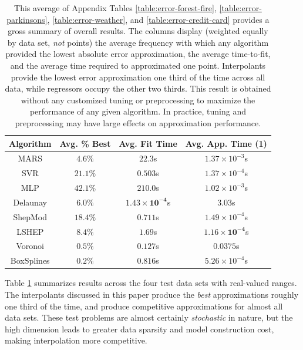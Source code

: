 \documentclass[smallextended,final]{svjour3}       %
\begin{document}
                                                                      
\begin{table}
  \centering
  \begin{tabular}{c|c|c|c}
    \hline
    Algorithm & Avg. \% Best & Avg. Fit Time & Avg. App. Time (1)\\
    \hline
    MARS & $4.6\%$ & $22.3$s & $1.37 \times 10^{-3}$s\\
    SVR & $\mathit{21.1}\%$ & $0.503$s & $\mathit{1.37 \times 10^{-4}}$s\\
    MLP & $\mathbf{42.1}\%$ & $210.0$s & $1.02 \times 10^{-3}$s\\
    Delaunay & $6.0\%$ & $\mathbf{1.43 \times 10^{-4}}$s & $3.03$s\\
    ShepMod & $18.4\%$ & $0.711$s & $1.49 \times 10^{-4}$s\\
    LSHEP & $8.4\%$ & $1.69$s & $\mathbf{1.16 \times 10^{-4}}$s\\
    Voronoi & $0.5\%$ & $\mathit{0.127}$s & $0.0375$s\\
    BoxSplines & $0.2\%$ & $0.816$s & $5.26 \times 10^{-4}$s\\
    \hline
  \end{tabular}
  \caption{This average of Appendix Tables
  \ref{table:error-forest-fire}, \ref{table:error-parkinsons},
  \ref{table:error-weather}, and \ref{table:error-credit-card} provides
  a gross summary of overall results. The columns display (weighted equally
  by data set, \textit{not} points) the average frequency with which any
  algorithm provided the lowest absolute error approximation, the average
  time-to-fit, and the average time required to approximated one point.
  Interpolants provide the lowest error approximation one third of the
  time across all data, while regressors occupy the other two thirds. This
  result is obtained without any customized tuning or preprocessing to
  maximize the performance of any given algorithm. In practice, tuning and
  preprocessing may have large effects on approximation performance.}

 \label{table:avg-performance}
\end{table}

Table \ref{table:avg-performance} summarizes results across the four test
data sets with real-valued ranges. The interpolants discussed in this paper
produce the \textit{best} approximations roughly one third of the time,
and produce competitive approximations for almost all data sets. These
test problems are almost certainly \textit{stochastic} in nature, but the
high dimension leads to greater data sparsity and model construction cost,
making interpolation more competitive.
\end{document}
